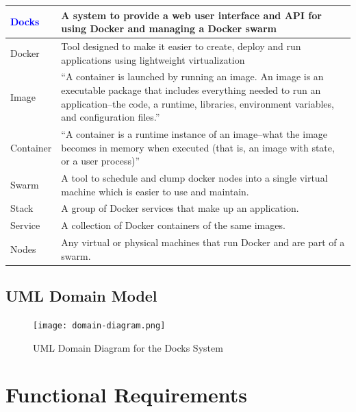\documentclass[]{article}
\newcommand{\docks}{\textcolor{Blue}{Docks} }
\newcommand{\docker}{Docker }
\begin{document}
\begin{table}[H]
	\begin{tabular}{|p{2cm}|p{10cm}|}
		\hline
		\docks &  A system to provide a web user interface and API for using \docker and managing a \docker swarm \\ \hline

		\docker & Tool designed to make it easier to create, deploy and run applications
		using lightweight virtualization \\ \hline

		Image & ``A container is launched by running an image.
		An image is an executable package that includes everything
		needed to run an application--the code, a runtime, libraries,
		environment variables, and configuration files.'' \\ \hline

		Container & ``A container is a runtime instance 
		of an image--what the image becomes in memory when 
		executed (that is, an image with state, or a user process)'' \\ \hline
		
		Swarm & A tool to schedule and clump docker nodes into a single virtual machine which is easier to use and maintain. \\ \hline
		
		Stack & A group of Docker services that make up an application. \\ \hline
		
		Service & A collection of Docker containers of the same images. \\ \hline
		
		Nodes & Any virtual or physical machines that run Docker and are part of a swarm. \\ \hline

	\end{tabular}
\end{table}

\subsection{UML Domain Model}

\begin{figure}[H]
	\centering
	\texttt{[image: domain-diagram.png]}
	\caption{UML Domain Diagram for the Docks System}
\end{figure}

\section{Functional Requirements}
\end{document}
